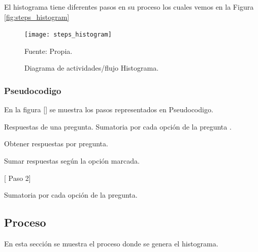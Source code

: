 El histograma tiene diferentes pasos en su proceso los cuales vemos en la Figura \ref{fig:steps_histogram}

\begin{figure}[ht]
	\begin{center}
		\texttt{[image: steps\_histogram]}
	\end{center}
	\begin{center}
		\vskip -0.5cm
		\caption{\small{Diagrama de actividades/flujo Histograma. }}
		{\small{Fuente: Propia.}}
	\end{center}
\end{figure}

\subsubsection{Pseudocodigo}
En la figura [] se muestra los pasos representados en Pseudocodigo.

\begin{algorithm}
	\begin{algorithmic}[2]
		\REQUIRE Respuestas de una pregunta.  %
		\label{lin:algorithm_histogram}
		\ENSURE Sumatoria por cada opción de la pregunta .                                                       %
		
		\STATE Obtener respuestas por pregunta.
		
		\STATE Sumar respuestas según la opción marcada. 
		
	
		 [ Paso 2]
		\ENDIF
		
		\RETURN  Sumatoria por cada opción de la pregunta.
		
	\end{algorithmic}
\end{algorithm}

\subsection{Proceso}

En esta sección se muestra el proceso donde se genera el histograma.























